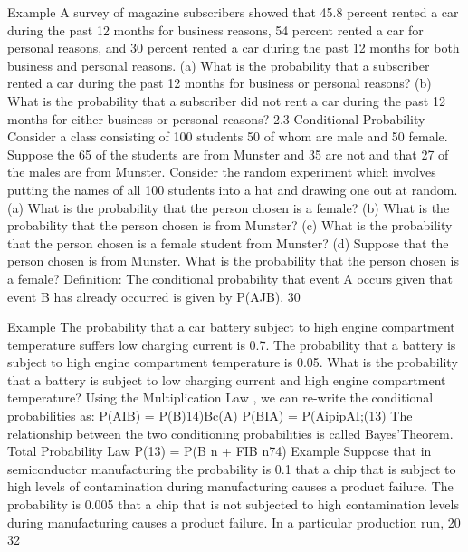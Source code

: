 Example A survey of magazine subscribers showed that 45.8 percent rented a car during the past 12 months for business reasons, 54 percent rented a car for personal reasons, and 30 percent rented a car during the past 12 months for both business and personal reasons. (a) What is the probability that a subscriber rented a car during the past 12 months for business or personal reasons? (b) What is the probability that a subscriber did not rent a car during the past 12 months for either business or personal reasons? 
2.3 Conditional Probability 
Consider a class consisting of 100 students 50 of whom are male and 50 female. Suppose the 65 of the students are from Munster and 35 are not and that 27 of the males are from Munster. Consider the random experiment which involves putting the names of all 100 students into a hat and drawing one out at random. (a) What is the probability that the person chosen is a female? (b) What is the probability that the person chosen is from Munster? (c) What is the probability that the person chosen is a female student from Munster? (d) Suppose that the person chosen is from Munster. What is the probability that the person chosen is a female? 
Definition: The conditional probability that event A occurs given that event B has already 
occurred is given by P(AJB). 
30 





Example The probability that a car battery subject to high engine compartment temperature suffers low charging current is 0.7. The probability that a battery is subject to high engine compartment temperature is 0.05. What is the probability that a battery is subject to low charging current and high engine compartment temperature? 
Using the Multiplication Law , we can re-write the conditional probabilities as: 
P(AIB) = P(B)14)Bc(A) P(BIA) = P(AipipAI;(13) 
The relationship between the two conditioning probabilities is called Bayes'Theorem. 
Total Probability Law 
P(13) = P(B n + FIB n74) 
Example Suppose that in semiconductor manufacturing the probability is 0.1 that a chip that is subject to high levels of contamination during manufacturing causes a product failure. The probability is 0.005 that a chip that is not subjected to high contamination levels during manufacturing causes a product failure. In a particular production run, 20%
32 


